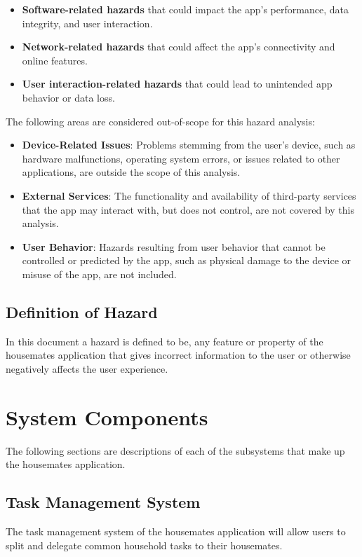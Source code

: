 \documentclass{article}
\begin{document}
\begin{itemize}
    \item \textbf{Software-related hazards} that could impact the app's performance, data integrity, and user interaction.
    \item \textbf{Network-related hazards} that could affect the app's connectivity and online features.
    \item \textbf{User interaction-related hazards} that could lead to unintended app behavior or data loss.
\end{itemize}

The following areas are considered out-of-scope for this hazard analysis:

\begin{itemize}
    \item \textbf{Device-Related Issues}: Problems stemming from the user's device, such as hardware malfunctions, operating system errors, or issues related to other applications, are outside the scope of this analysis.
    \item \textbf{External Services}: The functionality and availability of third-party services that the app may interact with, but does not control, are not covered by this analysis.
    \item \textbf{User Behavior}: Hazards resulting from user behavior that cannot be controlled or predicted by the app, such as physical damage to the device or misuse of the app, are not included.
\end{itemize}
\subsection{Definition of Hazard}

In this document a hazard is defined to be, any feature or property of the housemates application that gives incorrect information to the user or otherwise negatively affects the user experience.


\section{System Components}

The following sections are descriptions of each of the subsystems that make up the housemates application. 

\subsection{Task Management System}
The task management system of the housemates application will allow users to split and delegate common household tasks to their housemates.
\end{document}
